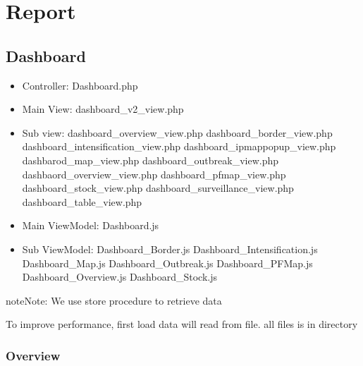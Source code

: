 \documentclass[letterpaper,10pt,english,openany,oneside]{sphinxmanual}
\begin{document}
\section{Report}
\label{\detokenize{module/module:report}}

\subsection{Dashboard}
\label{\detokenize{module/module:dashboard}}\begin{itemize}
\item {} 
\sphinxAtStartPar
Controller: Dashboard.php

\item {} 
\sphinxAtStartPar
Main View: dashboard\_v2\_view.php

\item {} 
\sphinxAtStartPar
Sub view:
\sphinxhyphen{} dashboard\_overview\_view.php
\sphinxhyphen{} dashboard\_border\_view.php
\sphinxhyphen{} dashboard\_intensification\_view.php
\sphinxhyphen{} dashboard\_ipmappopup\_view.php
\sphinxhyphen{} dashbarod\_map\_view.php
\sphinxhyphen{} dashboard\_outbreak\_view.php
\sphinxhyphen{} dashbaord\_overview\_view.php
\sphinxhyphen{} dashboard\_pfmap\_view.php
\sphinxhyphen{} dashboard\_stock\_view.php
\sphinxhyphen{} dashboard\_surveillance\_view.php
\sphinxhyphen{} dashboard\_table\_view.php

\item {} 
\sphinxAtStartPar
Main ViewModel: Dashboard.js

\item {} 
\sphinxAtStartPar
Sub ViewModel:
\sphinxhyphen{} Dashboard\_Border.js
\sphinxhyphen{} Dashboard\_Intensification.js
\sphinxhyphen{} Dashboard\_Map.js
\sphinxhyphen{} Dashboard\_Outbreak.js
\sphinxhyphen{} Dashboard\_PFMap.js
\sphinxhyphen{} Dashboard\_Overview.js
\sphinxhyphen{} Dashboard\_Stock.js

\end{itemize}

\begin{sphinxadmonition}{note}{Note:}
\sphinxAtStartPar
We use store procedure to retrieve data

\sphinxAtStartPar
To improve performance, first load data will read from file. all files is in  directory
\end{sphinxadmonition}


\subsubsection{Overview}
\label{\detokenize{module/module:overview}}
\end{document}
